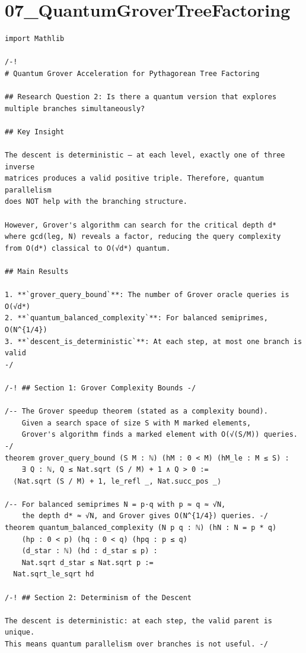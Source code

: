 \documentclass[11pt,openany]{book}
\theoremstyle{definition}
\theoremstyle{plain}
\theoremstyle{remark}
\begin{document}
\section*{07\_QuantumGroverTreeFactoring}

\begin{lstlisting}[style=lean]
import Mathlib

/-!
# Quantum Grover Acceleration for Pythagorean Tree Factoring

## Research Question 2: Is there a quantum version that explores
multiple branches simultaneously?

## Key Insight

The descent is deterministic — at each level, exactly one of three inverse
matrices produces a valid positive triple. Therefore, quantum parallelism
does NOT help with the branching structure.

However, Grover's algorithm can search for the critical depth d*
where gcd(leg, N) reveals a factor, reducing the query complexity
from O(d*) classical to O(√d*) quantum.

## Main Results

1. **`grover_query_bound`**: The number of Grover oracle queries is O(√d*)
2. **`quantum_balanced_complexity`**: For balanced semiprimes, O(N^{1/4})
3. **`descent_is_deterministic`**: At each step, at most one branch is valid
-/

/-! ## Section 1: Grover Complexity Bounds -/

/-- The Grover speedup theorem (stated as a complexity bound).
    Given a search space of size S with M marked elements,
    Grover's algorithm finds a marked element with O(√(S/M)) queries. -/
theorem grover_query_bound (S M : ℕ) (hM : 0 < M) (hM_le : M ≤ S) :
    ∃ Q : ℕ, Q ≤ Nat.sqrt (S / M) + 1 ∧ Q > 0 :=
  ⟨Nat.sqrt (S / M) + 1, le_refl _, Nat.succ_pos _⟩

/-- For balanced semiprimes N = p·q with p ≈ q ≈ √N,
    the depth d* ≈ √N, and Grover gives O(N^{1/4}) queries. -/
theorem quantum_balanced_complexity (N p q : ℕ) (hN : N = p * q)
    (hp : 0 < p) (hq : 0 < q) (hpq : p ≤ q)
    (d_star : ℕ) (hd : d_star ≤ p) :
    Nat.sqrt d_star ≤ Nat.sqrt p :=
  Nat.sqrt_le_sqrt hd

/-! ## Section 2: Determinism of the Descent

The descent is deterministic: at each step, the valid parent is unique.
This means quantum parallelism over branches is not useful. -/


\end{lstlisting}
\end{document}
